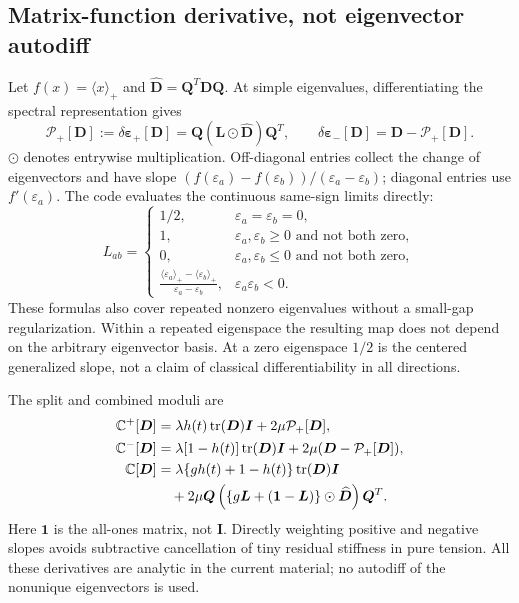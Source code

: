 \documentclass[11pt,a4paper]{article}
\newcommand{\eps}{\bm{\varepsilon}}
\newcommand{\I}{\bm{I}}
\newcommand{\D}{\bm{D}}
\newcommand{\C}{\mathbb{C}}
\newcommand{\tr}{\operatorname{tr}}
\newcommand{\pos}[1]{\langle #1\rangle_+}
\numberwithin{equation}{section}
\begin{document}
\subsection{Matrix-function derivative, not eigenvector autodiff}
Let $f(x)=\pos{x}$ and $\widehat{\D}=\bm Q^T\D\bm Q$. At simple
eigenvalues, differentiating the spectral representation gives
\begin{equation}
 \mathcal P_+[\D]:=\delta\eps_+[\D]
   =\bm Q\left(\bm L\odot\widehat{\D}\right)\bm Q^T,
 \qquad\delta\eps_-[\D]=\D-\mathcal P_+[\D].\label{eq:frechet}
\end{equation}
$\odot$ denotes entrywise multiplication. Off-diagonal entries collect the
change of eigenvectors and have slope
$(f(\varepsilon_a)-f(\varepsilon_b))/(\varepsilon_a-\varepsilon_b)$;
diagonal entries use $f'(\varepsilon_a)$. The code evaluates the continuous
same-sign limits directly:
\begin{equation}
 L_{ab}=\begin{cases}
 1/2,&\varepsilon_a=\varepsilon_b=0,\\
 1,&\varepsilon_a,\varepsilon_b\ge0\text{ and not both zero},\\
 0,&\varepsilon_a,\varepsilon_b\le0\text{ and not both zero},\\
 \displaystyle\frac{\pos{\varepsilon_a}-\pos{\varepsilon_b}}
 {\varepsilon_a-\varepsilon_b},&\varepsilon_a\varepsilon_b<0.
 \end{cases}\label{eq:slopes}
\end{equation}
These formulas also cover repeated nonzero eigenvalues without a small-gap
regularization. Within a repeated eigenspace the resulting map does not depend
on the arbitrary eigenvector basis. At a zero eigenspace $1/2$ is the centered
generalized slope, not a claim of classical differentiability in all directions.

The split and combined moduli are
\begin{align}
 \C^+[\D]&=\lambda h(t)\tr(\D)\I+2\mu\mathcal P_+[\D],\\
 \C^-[\D]&=\lambda[1-h(t)]\tr(\D)\I+2\mu(\D-\mathcal P_+[\D]),\\
 \C[\D]&=\lambda\{g h(t)+1-h(t)\}\tr(\D)\I\notag\\
 &\quad+2\mu\bm Q\left(\{g\bm L+(\bm1-\bm L)\}
                         \odot\widehat{\D}\right)\bm Q^T.\label{eq:spectral-C}
\end{align}
Here $\bm1$ is the all-ones matrix, not $\I$. Directly weighting positive and
negative slopes avoids subtractive cancellation of tiny residual stiffness in
pure tension. All these derivatives are analytic in the current material;
no autodiff of the nonunique eigenvectors is used.
\end{document}
